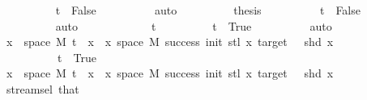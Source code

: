 \begin{isabellebody}
\ \ \ \ \ \ \ \ \isamarkupfalse%
\ {\isacartoucheopen}t\ {\isacharequal}{\kern0pt}\ False{\isacartoucheclose}\isanewline
\ \ \ \ \ \ \ \ \isamarkupfalse%
\ auto\isanewline
\ \ \ \ \ \ \isamarkupfalse%
\ \isamarkupfalse%
\ {\isacharquery}{\kern0pt}thesis\isanewline
\ \ \ \ \ \ \ \ \isamarkupfalse%
\ {\isacartoucheopen}t\ {\isacharequal}{\kern0pt}\ False{\isacartoucheclose}\isanewline
\ \ \ \ \ \ \ \ \isamarkupfalse%
\ auto\isanewline
\ \ \ \ \isamarkupfalse%
\isanewline
\ \ \ \ \ \ \isamarkupfalse%
\ {\isachardoublequoteopen}t{\isachardoublequoteclose}\isanewline
\ \ \ \ \ \ \isamarkupfalse%
\ \isamarkupfalse%
\ {\isachardoublequoteopen}t\ {\isacharequal}{\kern0pt}\ True{\isachardoublequoteclose}\isanewline
\ \ \ \ \ \ \ \ \isamarkupfalse%
\ auto\isanewline
\ \ \ \ \ \ \isamarkupfalse%
\ \isamarkupfalse%
\ {\isachardoublequoteopen}{\isacharbraceleft}{\kern0pt}x\ {\isasymin}\ space\ M{\isachardot}{\kern0pt}\ t\ {\isacharhash}{\kern0pt}{\isacharhash}{\kern0pt}\ x\ {\isasymin}\ {\isacharbraceleft}{\kern0pt}x{\isasymin}\ space\ M{\isachardot}{\kern0pt}\ success\ {\isacharparenleft}{\kern0pt}init{\isacharminus}{\kern0pt}{}{\isacharparenright}{\kern0pt}\ {\isacharparenleft}{\kern0pt}stl\ x{\isacharparenright}{\kern0pt}\ target\ {\isasymand}\ {\isasymnot}\ shd\ x{\isacharbraceright}{\kern0pt}{\isacharbraceright}{\kern0pt}\ {\isacharequal}{\kern0pt}\ {\isacharbraceleft}{\kern0pt}{\isacharbraceright}{\kern0pt}{\isachardoublequoteclose}\isanewline
\ \ \ \ \ \ \ \ \ \ {\isachardoublequoteopen}t\ {\isacharequal}{\kern0pt}\ True{\isachardoublequoteclose}\isanewline
\ \ \ \ \ \ \isamarkupfalse%
{\isacharminus}{\kern0pt}\isanewline
\ \ \ \ \ \ \ \ \isamarkupfalse%
\ {\isachardoublequoteopen}{\isasymforall}x\ {\isasymin}\ space\ M{\isachardot}{\kern0pt}\ t\ {\isacharhash}{\kern0pt}{\isacharhash}{\kern0pt}\ x\ {\isasymnotin}\ {\isacharbraceleft}{\kern0pt}x{\isasymin}\ space\ M{\isachardot}{\kern0pt}\ success\ {\isacharparenleft}{\kern0pt}init{\isacharminus}{\kern0pt}{}{\isacharparenright}{\kern0pt}\ {\isacharparenleft}{\kern0pt}stl\ x{\isacharparenright}{\kern0pt}\ target\ {\isasymand}\ {\isasymnot}\ shd\ x{\isacharbraceright}{\kern0pt}{\isachardoublequoteclose}\isanewline
\ \ \ \ \ \ \ \ \ \ \isamarkupfalse%
\ stream{\isachardot}{\kern0pt}sel{\isacharparenleft}{\kern0pt}{}{\isacharparenright}{\kern0pt}\ that\isanewline

\end{isabellebody}
